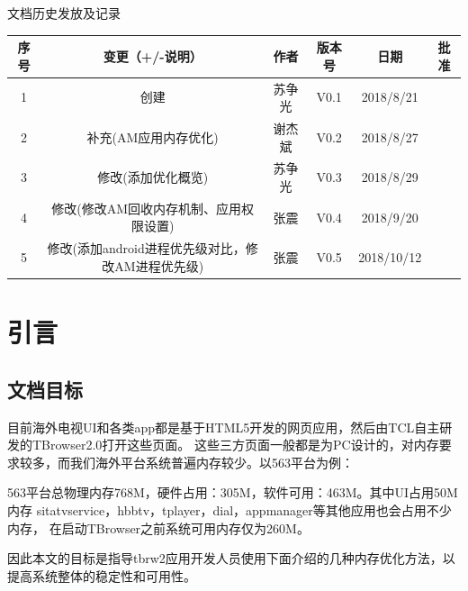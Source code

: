 \begin{table}
\begin{center}
\Large
文档历史发放及记录\vspace{3ex}\\
\scriptsize
\begin{tabular}{|c|c|c|c|c|c|}
\hline
序号 & 变更（+/-说明） & 作者 & 版本号 & 日期 & 批准 \\
\hline  
1 & 创建 & 苏争光 & V0.1 & 2018/8/21 &  \\\hline  
2 & 补充(AM应用内存优化) & 谢杰斌 & V0.2 & 2018/8/27 &  \\\hline
3 & 修改(添加优化概览) & 苏争光 & V0.3 & 2018/8/29 &  \\\hline
4 & 修改(修改AM回收内存机制、应用权限设置) & 张震 & V0.4 & 2018/9/20 &  \\\hline
5 & 修改(添加android进程优先级对比，修改AM进程优先级) & 张震 & V0.5 & 2018/10/12 &  \\
\hline
\end{tabular}
\end{center}
\end{table}
\clearpage


\renewcommand{\contentsname}{\hspace*{\fill}目\quad 录\hspace*{\fill}}
\tableofcontents


\vspace{50ex}
\section{引言}
\subsection{文档目标}
目前海外电视UI和各类app都是基于HTML5开发的网页应用，然后由TCL自主研发的TBrowser2.0打开这些页面。
这些三方页面一般都是为PC设计的，对内存要求较多，而我们海外平台系统普遍内存较少。以563平台为例：\par
563平台总物理内存768M，硬件占用：305M，软件可用：463M。其中UI占用50M内存
sitatvservice，hbbtv，tplayer，dial，appmanager等其他应用也会占用不少内存，
在启动TBrowser之前系统可用内存仅为260M。\par
因此本文的目标是指导tbrw2应用开发人员使用下面介绍的几种内存优化方法，以提高系统整体的稳定性和可用性。\par

